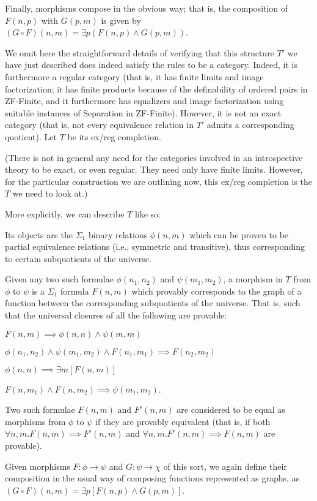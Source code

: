 Finally, morphisms compose in the obvious way; that is, the composition of $F(n, p)$ with $G(p, m)$ is given by $(G \circ F)(n, m) = \exists p (F(n, p) \wedge G(p, m))$.

We omit here the straightforward details of verifying that this structure $T'$ we have just described does indeed satisfy the rules to be a category. Indeed, it is furthermore a regular category (that is, it has finite limits and image factorization; it has finite products because of the definability of ordered pairs in ZF-Finite, and it furthermore has equalizers and image factorization using suitable instances of Separation in ZF-Finite). However, it is not an exact category (that is, not every equivalence relation in $T'$ admits a corresponding quotient). Let $T$ be its ex/reg completion.

(There is not in general any need for the categories involved in an introspective theory to be exact, or even regular. They need only have finite limits. However, for the particular construction we are outlining now, this ex/reg completion is the $T$ we need to look at.)

More explicitly, we can describe $T$ like so:

Its objects are the $\Sigma_1$ binary relations $\phi(n, m)$ which can be proven to be partial equivalence relations (i.e., symmetric and transitive), thus corresponding to certain subquotients of the universe.

Given any two such formulae $\phi(n_1, n_2)$ and $\psi(m_1, m_2)$, a morphism in $T$ from $\phi$ to $\psi$ is a $\Sigma_1$ formula $F(n, m)$ which provably corresponds to the graph of a function between the corresponding subquotients of the universe. That is, such that the universal closures of all the following are provable:

$F(n, m) \implies \phi(n, n) \wedge \psi(m, m)$

$\phi(n_1, n_2) \wedge \psi(m_1, m_2) \wedge F(n_1, m_1) \implies F(n_2, m_2)$

$\phi(n, n) \implies \exists m [F(n, m)]$

$F(n, m_1) \wedge F(n, m_2) \implies \psi(m_1, m_2)$.

Two such formulae $F(n, m)$ and $F'(n, m)$ are considered to be equal as morphisms from $\phi$ to $\psi$ if they are provably equivalent (that is, if both $\forall n, m . F(n, m) \implies F'(n, m)$ and $\forall n, m . F'(n, m) \implies F(n, m)$ are provable).

Given morphisms $F : \phi \to \psi$ and $G: \psi \to \chi$ of this sort, we again define their composition in the usual way of composing functions represented as graphs, as $(G \circ F)(n, m) = \exists p [F(n, p) \wedge G(p, m)]$.

